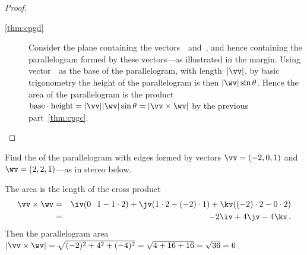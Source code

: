 \begin{proof}
\begin{description}
\item[\ref{thm:cpgd}] Consider the plane containing the vectors~\vv\ and~\wv, 
%
and hence containing the parallelogram formed by these vectors---as illustrated in the margin.
Using vector~\vv\ as the base of the parallelogram, with length~\(|\vv|\), by basic trigonometry the height of the parallelogram is then \(|\wv|\sin\theta\).
Hence the area of the parallelogram is the product 
\(\text{base}\cdot\text{height}=|\vv||\wv|\sin\theta=|\vv\times\wv|\) by the previous part~\ref{thm:cpgc}.
\end{description}
\end{proof}


\begin{example} \label{eg:apvw}
Find the  of the parallelogram with edges formed by vectors
\(\vv=(-2,0,1)\) and \(\wv=(2,2,1)\)---as in stereo below.
\begin{center}
\end{center}
\begin{solution} 
The area is the length of the cross product
\begin{eqnarray*}
\vv\times\wv
&=&\iv(0\cdot 1-1\cdot 2)
+\jv(1\cdot 2-(-2)\cdot 1)
+\kv((-2)\cdot 2-0\cdot 2)
\\&=&-2\iv+4\jv-4\kv\,.
\end{eqnarray*}
Then the parallelogram area \(|\vv\times\wv|=\sqrt{(-2)^2+4^2+(-4)^2}
=\sqrt{4+16+16}=\sqrt{36}=6\)\,.
\end{solution}
\end{example}




